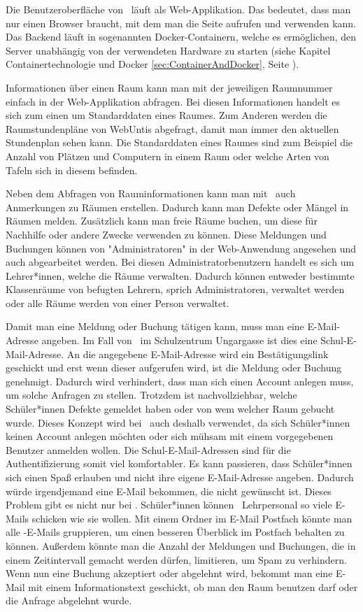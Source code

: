 Die Benutzeroberfläche von \ZELIA\ läuft als Web-Applikation. Das bedeutet, dass man nur einen Browser braucht, mit dem man die Seite aufrufen und verwenden kann. Das Backend läuft in sogenannten Docker-Containern, welche es ermöglichen, den Server unabhängig von der verwendeten Hardware zu starten (siehe Kapitel Containertechnologie und Docker \ref{sec:ContainerAndDocker}, Seite \pageref{sec:ContainerAndDocker}).

Informationen über einen Raum kann man mit der jeweiligen Raumnummer einfach in der Web-Applikation abfragen. Bei diesen Informationen handelt es sich zum einen um Standarddaten eines Raumes. Zum Anderen werden die Raumstundenpläne von WebUntis abgefragt, damit man immer den aktuellen Stundenplan sehen kann. Die Standarddaten eines Raumes sind zum Beispiel die Anzahl von Plätzen und Computern in einem Raum oder welche Arten von Tafeln sich in diesem befinden.

Neben dem Abfragen von Rauminformationen kann man mit \ZELIA\ auch Anmerkungen zu Räumen erstellen. Dadurch kann man Defekte oder Mängel in Räumen melden. Zusätzlich kann man freie Räume buchen, um diese für Nachhilfe oder andere Zwecke verwenden zu können. Diese Meldungen und Buchungen können von "Administratoren" in der Web-Anwendung angesehen und auch abgearbeitet werden. Bei diesen Administratorbenutzern handelt es sich um Lehrer*innen, welche die Räume verwalten. Dadurch können entweder bestimmte Klassenräume von befugten Lehrern, sprich Administratoren, verwaltet werden oder alle Räume werden von einer Person verwaltet.

Damit man eine Meldung oder Buchung tätigen kann, muss man eine E-Mail-Adresse angeben. Im Fall von \ZELIA\ im Schulzentrum Ungargasse ist dies eine Schul-E-Mail-Adresse. An die angegebene E-Mail-Adresse wird ein Bestätigungslink geschickt und erst wenn dieser aufgerufen wird, ist die Meldung oder Buchung genehmigt. Dadurch wird verhindert, dass man sich einen Account anlegen muss, um solche Anfragen zu stellen. Trotzdem ist nachvollziehbar, welche Schüler*innen Defekte gemeldet haben oder von wem welcher Raum gebucht wurde. Dieses Konzept wird bei \ZELIA\ auch deshalb verwendet, da sich Schüler*innen keinen Account anlegen möchten oder sich mühsam mit einem vorgegebenen Benutzer anmelden wollen. Die Schul-E-Mail-Adressen sind für die Authentifizierung somit viel komfortabler. Es kann passieren, dass Schüler*innen sich einen Spaß erlauben und nicht ihre eigene E-Mail-Adresse angeben. Dadurch würde irgendjemand eine E-Mail bekommen, die nicht gewünscht ist. Dieses Problem gibt es nicht nur bei \ZELIA. Schüler*innen können \zb\ Lehrpersonal so viele E-Mails schicken wie sie wollen. Mit einem Ordner im E-Mail Postfach könnte man alle \ZELIA-E-Mails gruppieren, um einen besseren Überblick im Postfach behalten zu können. Außerdem könnte man die Anzahl der Meldungen und Buchungen, die in einem Zeitintervall gemacht werden dürfen, limitieren, um Spam zu verhindern. Wenn nun eine Buchung akzeptiert oder abgelehnt wird, bekommt man eine E-Mail mit einem Informationstext geschickt, ob man den Raum benutzen darf oder die Anfrage abgelehnt wurde.

